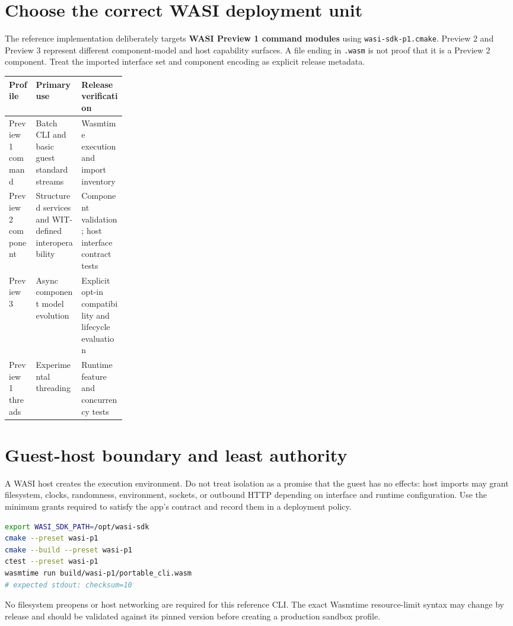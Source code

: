 \documentclass[11pt,letterpaper]{article}
\begin{document}
\frontmatterdoc
\section{Choose the correct WASI deployment unit}
The reference implementation deliberately targets \textbf{WASI Preview 1 command modules} using \texttt{wasi-sdk-p1.cmake}. Preview 2 and Preview 3 represent different component-model and host capability surfaces. A file ending in \texttt{.wasm} is not proof that it is a Preview 2 component. Treat the imported interface set and component encoding as explicit release metadata.

\noindent\begin{tabularx}{\linewidth}{p{0.23\linewidth}X X}
\toprule Profile & Primary use & Release verification \\ \midrule
Preview 1 command & Batch CLI and basic guest standard streams & Wasmtime execution and import inventory \\
Preview 2 component & Structured services and WIT-defined interoperability & Component validation; host interface contract tests \\
Preview 3 & Async component model evolution & Explicit opt-in compatibility and lifecycle evaluation \\
Preview 1 threads & Experimental threading & Runtime feature and concurrency tests \\
\bottomrule
\end{tabularx}

\section{Guest-host boundary and least authority}
A WASI host creates the execution environment. Do not treat isolation as a promise that the guest has no effects: host imports may grant filesystem, clocks, randomness, environment, sockets, or outbound HTTP depending on interface and runtime configuration. Use the minimum grants required to satisfy the app's contract and record them in a deployment policy.

\begin{lstlisting}[language=bash,caption={Preview 1 runtime smoke test}]
export WASI_SDK_PATH=/opt/wasi-sdk
cmake --preset wasi-p1
cmake --build --preset wasi-p1
ctest --preset wasi-p1
wasmtime run build/wasi-p1/portable_cli.wasm
# expected stdout: checksum=10
\end{lstlisting}
No filesystem preopens or host networking are required for this reference CLI. The exact Wasmtime resource-limit syntax may change by release and should be validated against its pinned version before creating a production sandbox profile.
\end{document}
